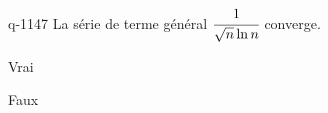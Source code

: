 \begin{truefalse}{q-1147}
La série de terme général $\cfrac1{\sqrt{n}\ln n}$ converge.
\item Vrai
\item* Faux
\end{truefalse}

